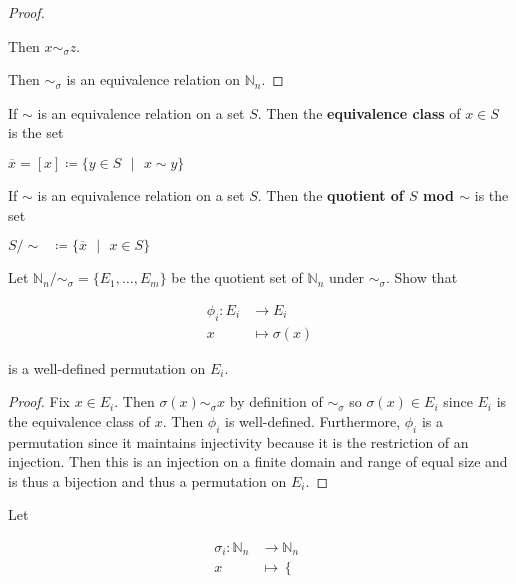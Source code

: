 \documentclass{article}
\newenvironment{definition}[2][Definition]{\begin{trivlist}
\item[\hskip \labelsep {\emph{#1}}\hskip \labelsep {#2.}]}{\end{trivlist}}
\begin{document}
\begin{itemize}
\begin{proof}
\begin{enumerate}
        Then $x\sim_\sigma z$.
      \end{enumerate}
      Then $\sim_\sigma$ is an equivalence relation on $\mathbb{N}_n$. 
    \end{proof}
    \begin{definition}
      \\If $\sim$ is an equivalence relation on a set $S$. Then the \textbf{equivalence class} of $x\in S$ is the set
      \begin{center}
        $\overline{x} = [x] \coloneq \{y\in S\text{ }\vert\text{ } x\sim y\}$
      \end{center}
    \end{definition}
    \begin{definition}
      \\If $\sim$ is an equivalence relation on a set $S$. Then the \textbf{quotient of $S$ mod $\sim$} is the set
      \begin{center}
        $S/\sim\text{ }\coloneq \{\overline{x}\text{ }\vert\text{ }x\in S\}$
      \end{center}
    \end{definition}
    \item [3.]Let $\mathbb{N}_n/\sim_\sigma = \{E_1,\dots,E_m\}$ be the quotient set of $\mathbb{N}_n$ under $\sim_\sigma$. Show that 
    \begin{center}
    \begin{align*}
        \phi_i: E_i &\rightarrow E_i
        \\x &\mapsto \sigma(x)
    \end{align*}
    \end{center}
    is a well-defined permutation on $E_i$.
    \begin{proof}
      Fix $x\in E_i$. Then $\sigma(x) \sim_\sigma x$ by definition of $\sim_\sigma$ so $\sigma(x)\in E_i$ since $E_i$ is the equivalence class of $x$. Then $\phi_i$ is well-defined.
      Furthermore, $\phi_i$ is a permutation since it maintains injectivity because it is the restriction of an injection. Then this is an injection on a finite domain and range of equal size and is thus a bijection
      and thus a permutation on $E_i$. 
    \end{proof}
    \item [4.] Let 
    \begin{center}
    \begin{align*}
        \sigma_i: \mathbb{N}_n &\rightarrow \mathbb{N}_n
        \\x &\mapsto \begin{cases} 

\end{cases}
\end{align*}
\end{center}
\end{itemize}
\end{document}
